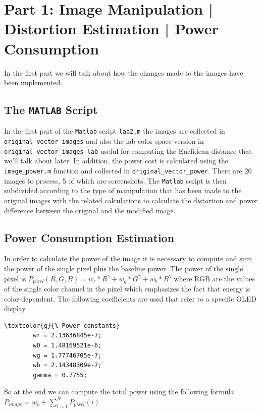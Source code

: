 \documentclass[a4paper]{article}
\begin{document}
%
\section{Part 1: Image Manipulation | Distortion Estimation | Power Consumption}
In the first part we will talk about how the changes made to the images have been implemented.

    \subsection{The \texttt{MATLAB} Script}
    In the first part of the \texttt{Matlab} script \texttt{lab2.m} the images are collected in \texttt{original\_vector\_images} and also the lab color space version in \texttt{original\_vector\_images\_lab} useful for computing the Euclidean distance that we'll talk about later. In addition, the power cost is calculated using the \texttt{image\_power.m} function and collected in \texttt{original\_vector\_power}.
    There are 20 images to process, 5 of which are screenshots.
    The \texttt{Matlab} script is then subdivided according to the type of manipulation that has been made to the original images with the related calculations to calculate the distortion and power difference between the original and the modified image.

    \subsection{Power Consumption Estimation}
    In order to calculate the power of the image it is necessary to compute and sum the power of the single pixel plus the baseline power. The power of the single pixel is
        $P_{pixel}(R,G,B)= w_r*R^\gamma+ w_g*G^\gamma + w_b*B^\gamma$ where RGB are the values of the single color channel in the pixel which emphasizes the fact that energy is color-dependent. The following coefficients are used that refer to a specific OLED display.
    \begin{Verbatim}[commandchars=\\\{\}]
        \textcolor{g}{% Power constants}
        wr = 2.13636845e-7;
        w0 = 1.48169521e-6;
        wg = 1.77746705e-7;
        wb = 2.14348309e-7;
        gamma = 0.7755;

    \end{Verbatim}
    So at the end we can compute the total power using the following formula $P_{image}=w_o + \sum_{i=1}^N P_{pixel}(i)$
\end{document}
